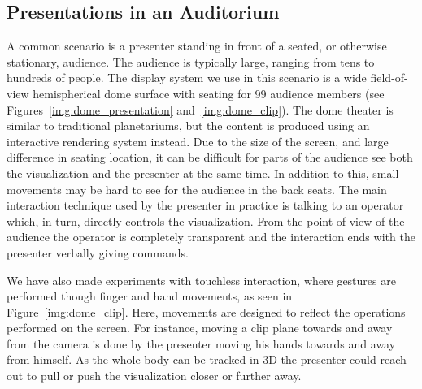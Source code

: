 \documentclass[review,journal]{vgtc}         %
\begin{document}
\subsection{Presentations in an Auditorium} \label{sec:largeaudience}
A common scenario is a presenter standing in front of a seated, or otherwise stationary, audience. 
The audience is typically large, ranging from tens to hundreds of people.
The display system we use in this scenario is a wide field-of-view hemispherical dome surface with seating for 99 audience members (see Figures~\ref{img:dome_presentation} and~\ref{img:dome_clip}).
The dome theater is similar to traditional planetariums, but the content is produced using an interactive rendering system instead.
Due to the size of the screen, and large difference in seating location, it can be difficult for parts of the audience see both the visualization and the presenter at the same time. 
In addition to this, small movements may be hard to see for the audience in the back seats. 
The main interaction technique used by the presenter in practice is talking to an operator which, in turn, directly controls the visualization.
From the point of view of the audience the operator is completely transparent and the interaction ends with the presenter verbally giving commands.

We have also made experiments with touchless interaction, where gestures are performed though finger and hand movements, as seen in Figure~\ref{img:dome_clip}.
Here, movements are designed to reflect the operations performed on the screen.
For instance, moving a clip plane towards and away from the camera is done by the presenter moving his hands towards and away from himself. As the whole-body can be tracked in 3D the presenter could reach out to pull or push the visualization closer or further away.

\end{document}
